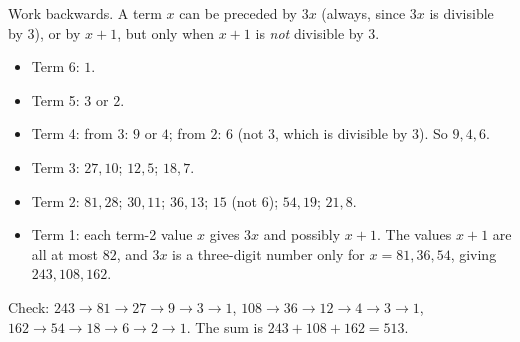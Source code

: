 Work backwards. A term $x$ can be preceded by $3x$ (always, since $3x$ is divisible by $3$), or by $x+1$, but only when $x+1$ is \emph{not} divisible by $3$.

\begin{itemize}
\item Term 6: $1$.
\item Term 5: $3$ or $2$.
\item Term 4: from $3$: $9$ or $4$; from $2$: $6$ (not $3$, which is divisible by $3$). So $9,4,6$.
\item Term 3: $27,10$; $12,5$; $18,7$.
\item Term 2: $81,28$; $30,11$; $36,13$; $15$ (not $6$); $54,19$; $21,8$.
\item Term 1: each term-2 value $x$ gives $3x$ and possibly $x+1$. The values $x+1$ are all at most $82$, and $3x$ is a three-digit number only for $x=81,36,54$, giving $243,108,162$.
\end{itemize}
Check: $243\to81\to27\to9\to3\to1$, $108\to36\to12\to4\to3\to1$, $162\to54\to18\to6\to2\to1$. The sum is $243+108+162=\boxed{513}$.
